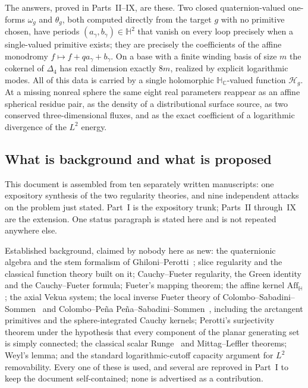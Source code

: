 \documentclass[11pt,a4paper]{article}
\numberwithin{equation}{section}
\theoremstyle{definition}
\theoremstyle{remark}
\theoremstyle{plain}
\newcommand{\HH}{\mathbb H}
\newcommand{\HC}{\mathbb H_{\mathbb C}}
\newcommand{\lap}{\Delta_4}
\newcommand{\Aff}{\mathrm{Aff}_{\HH}}
\newcommand{\om}{\omega}
\newcommand{\thet}{\theta}
\newcommand{\Hg}{\mathcal H_{g}}      %
\begin{document}
The answers, proved in Parts~II--IX, are these. Two closed quaternion-valued
one-forms $\om_g$ and $\thet_g$, both computed directly from the target $g$
with no primitive chosen, have periods $(a_\gamma,b_\gamma)\in\HH^2$ that
vanish on every loop precisely when a single-valued primitive exists; they are
precisely the coefficients of the affine monodromy
$f\mapsto f+qa_\gamma+b_\gamma$. On a base with a finite winding basis of size
$m$ the cokernel of $\lap$ has real dimension exactly $8m$, realized by
explicit logarithmic modes. All of this data is carried by a single
holomorphic $\HC$-valued function $\Hg$. At a missing nonreal sphere the same
eight real parameters reappear as an affine spherical residue pair, as the
density of a distributional surface source, as two conserved three-dimensional
fluxes, and as the exact coefficient of a logarithmic divergence of the
$L^2$ energy.

\subsection{What is background and what is proposed}
\label{a:sec:status}

This document is assembled from ten separately written manuscripts: one
expository synthesis of the two regularity theories, and nine independent
attacks on the problem just stated. Part~I is the expository trunk; Parts~II
through~IX are the extension. One status paragraph is stated here and is not
repeated anywhere else.

Established background, claimed by nobody here as new: the quaternionic
algebra and the stem formalism of Ghiloni--Perotti~\cite{GP}; slice regularity and the
classical function theory built on it; Cauchy--Fueter regularity, the Green
identity and the Cauchy--Fueter formula; Fueter's mapping theorem; the affine
kernel $\Aff$; the axial Vekua system; the local inverse Fueter theory of
Colombo--Sabadini--Sommen~\cite{CSS} and Colombo--Pe\~na Pe\~na--Sabadini--Sommen~\cite{CPSS},
including the arctangent primitives and the sphere-integrated Cauchy kernels;
Perotti's surjectivity theorem under the hypothesis that every component of
the planar generating set is simply connected; the classical scalar Runge~\cite{Runge} and
Mittag--Leffler theorems; Weyl's lemma; and the standard logarithmic-cutoff
capacity argument for $L^2$ removability. Every one of these is used, and
several are reproved in Part~I to keep the document self-contained; none is
advertised as a contribution.
\end{document}
